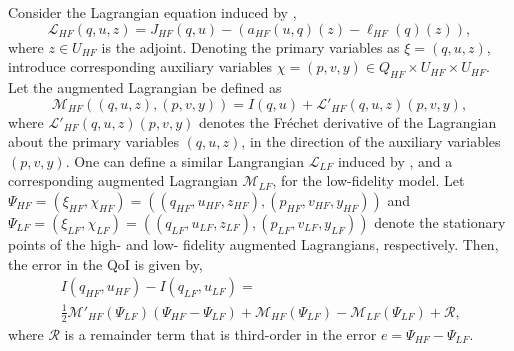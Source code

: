 \begin{proposition}
Consider the Lagrangian equation induced by ,
%
\begin{equation}
\label{eq:InvsOpt_lag}
\mathcal{L}_{HF}(q,u,z)= J_{HF}(q,u)-(a_{HF}(u,q)(z)-\ell_{HF}(q)(z)),
\end{equation}
%
where $z\in U_{HF}$ is the adjoint. Denoting the primary variables as $\xi=(q,u,z)$, introduce corresponding auxiliary variables $\chi=(p,v,y)\in Q_{HF}\times U_{HF}\times U_{HF}$. Let the augmented Lagrangian be defined as
%
\begin{equation}
\label{eq:InvsOpt_auglag}
\mathcal{M}_{HF}((q,u,z),(p,v,y)) = I(q,u) + \mathcal{L}'_{HF}(q,u,z)(p,v,y),
\end{equation}
%
where $\mathcal{L}'_{HF}(q,u,z)(p,v,y)$ denotes the Fr\'{e}chet derivative of the Lagrangian about the primary variables $(q,u,z)$, in the direction of the auxiliary variables $(p,v,y)$. One can define a similar Langrangian $\mathcal{L}_{LF}$ induced by , and a corresponding augmented Lagrangian $\mathcal{M}_{LF}$, for the low-fidelity model. Let $\Psi_{HF}= (\xi_{HF},\chi_{HF})=((q_{HF},u_{HF},z_{HF}),(p_{HF},v_{HF},y_{HF}))$ and $\Psi_{LF}= (\xi_{LF},\chi_{LF})=((q_{LF},u_{LF},z_{LF}),(p_{LF},v_{LF},y_{LF}))$ denote the stationary points of the high- and low- fidelity augmented Lagrangians, respectively. Then, the error in the QoI is given by,
%
\begin{multline}
\label{eq:semifinErrExp}
I(q_{HF},u_{HF})-I(q_{LF},u_{LF})=\\\frac{1}{2}\mathcal{M}'_{HF}(\Psi_{LF})(\Psi_{HF}-\Psi_{LF})+\mathcal{M}_{HF}(\Psi_{LF})-\mathcal{M}_{LF}(\Psi_{LF})+\mathcal{R}\textrm{,}
\end{multline}
%
where $\mathcal{R}$ is a remainder term that is third-order in the error $e=\Psi_{HF}-\Psi_{LF}$.
\end{proposition}
%
